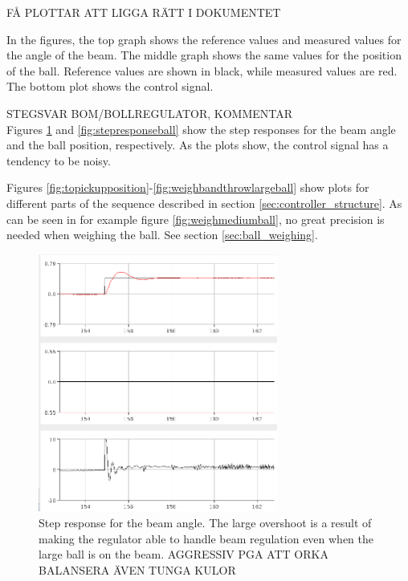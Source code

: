 
FÅ PLOTTAR ATT LIGGA RÄTT I DOKUMENTET

In the figures, the top graph shows the reference values and measured values for the angle of the beam. 
The middle graph shows the same values for the position of the ball. 
Reference values are shown in black, while measured values are red. 
The bottom plot shows the control signal.

STEGSVAR BOM/BOLLREGULATOR, KOMMENTAR \\
Figures \ref{fig:stepresponsebeam} and \ref{fig:stepresponseball} show the step responses for the beam angle and the ball position, respectively. 
As the plots show, the control signal has a tendency to be noisy.

Figures \ref{fig:topickupposition}-\ref{fig:weighbandthrowlargeball} show plots for different parts of the sequence described in section \ref{sec:controller_structure}.
As can be seen in for example figure \ref{fig:weighmediumball}, no great precision is needed when weighing the ball. See section \ref{sec:ball_weighing}.

\begin{figure}[h]
\centering
\includegraphics[width=0.7\textwidth]{figures/stepresponsebeam-crop.png}
\caption{Step response for the beam angle. The large overshoot is a result of making the regulator able to handle beam regulation even when the large ball is on the beam. AGGRESSIV PGA ATT ORKA BALANSERA ÄVEN TUNGA KULOR}
\label{fig:stepresponsebeam}
\end{figure}

